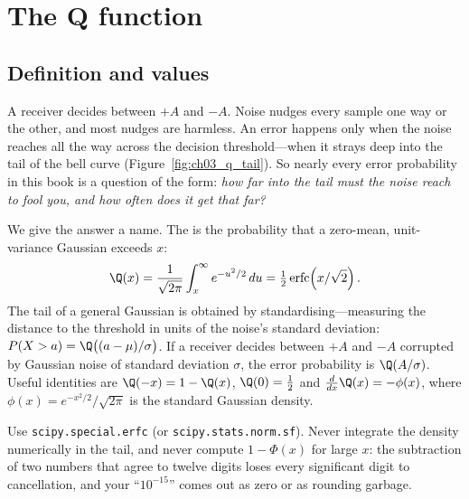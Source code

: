 \section{The Q function}
\label{sec:ch03:qfunc}

\subsection{Definition and values}

A receiver decides between $+A$ and $-A$. Noise nudges every sample one way or the other, and most
nudges are harmless. An error happens only when the noise reaches all the way across the decision
threshold---when it strays deep into the tail of the bell curve (Figure~\ref{fig:ch03_q_tail}). So
nearly every error probability in this book is a question of the form: \emph{how far into the tail
must the noise reach to fool you, and how often does it get that far?}


We give the answer a name. The  is the probability that a zero-mean,
unit-variance Gaussian exceeds $x$:
\begin{equation}
\Q(x)=\frac{1}{\sqrt{2\pi}}\int_x^\infty e^{-u^2/2}\,du=\tfrac12\operatorname{erfc}\!\left(x/\sqrt2\right).
\label{eq:ch03:q}
\end{equation}
The tail of a general Gaussian is obtained by standardising---measuring the distance to the
threshold in units of the noise's standard deviation: $P(X>a)=\Q\big((a-\mu)/\sigma\big)$. If a
receiver decides between $+A$ and $-A$ corrupted by Gaussian noise of standard deviation $\sigma$,
the error probability is $\Q(A/\sigma)$. Useful identities are $\Q(-x)=1-\Q(x)$, $\Q(0)=\tfrac12$
and $\frac{d}{dx}\Q(x)=-\phi(x)$, where $\phi(x)=e^{-x^2/2}/\sqrt{2\pi}$ is the standard Gaussian
density.

\begin{pitfall}
Use \texttt{scipy.special.erfc} (or \texttt{scipy.stats.norm.sf}). Never integrate the density
numerically in the tail, and never compute $1-\Phi(x)$ for large $x$: the subtraction of two
numbers that agree to twelve digits loses every significant digit to cancellation, and your
``$10^{-15}$'' comes out as zero or as rounding garbage.
\end{pitfall}

